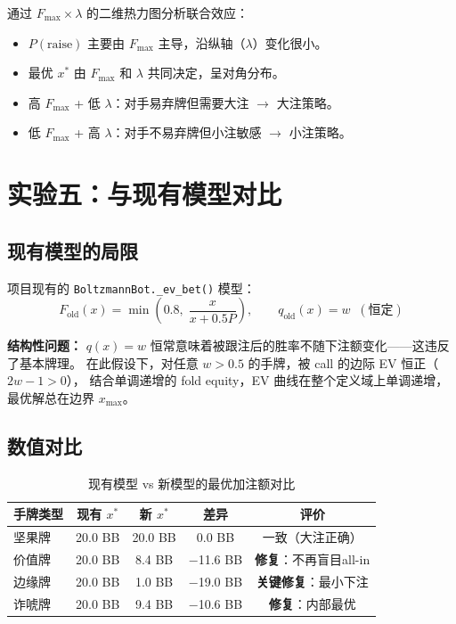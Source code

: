 \documentclass[12pt,a4paper]{ctexart}
\begin{document}
通过 $F_{\max} \times \lambda$ 的二维热力图分析联合效应：
\begin{itemize}
    \item $P(\text{raise})$ 主要由 $F_{\max}$ 主导，沿纵轴（$\lambda$）变化很小。
    \item 最优 $x^*$ 由 $F_{\max}$ 和 $\lambda$ 共同决定，呈对角分布。
    \item 高 $F_{\max}$ + 低 $\lambda$：对手易弃牌但需要大注 $\to$ 大注策略。
    \item 低 $F_{\max}$ + 高 $\lambda$：对手不易弃牌但小注敏感 $\to$ 小注策略。
\end{itemize}

\section{实验五：与现有模型对比}

\subsection{现有模型的局限}

项目现有的 \texttt{BoltzmannBot.\_ev\_bet()} 模型：
\begin{equation}
F_{\text{old}}(x) = \min\left(0.8,\; \frac{x}{x+0.5P}\right), \qquad
q_{\text{old}}(x) = w \;\;(\text{恒定})
\end{equation}

\textbf{结构性问题：}
$q(x) = w$ 恒常意味着被跟注后的胜率不随下注额变化——这违反了基本牌理。
在此假设下，对任意 $w > 0.5$ 的手牌，被 call 的边际 EV 恒正（$2w-1 > 0$），
结合单调递增的 fold equity，EV 曲线在整个定义域上单调递增，最优解总在边界 $x_{\max}$。

\subsection{数值对比}

\begin{table}[H]
\centering
\caption{现有模型 vs 新模型的最优加注额对比}
\begin{tabular}{@{}lcccc@{}}
\toprule
\textbf{手牌类型} & \textbf{现有 $x^*$} & \textbf{新 $x^*$} & \textbf{差异} & \textbf{评价} \\
\midrule
坚果牌  & 20.0 BB & 20.0 BB & 0.0 BB & 一致（大注正确） \\
价值牌  & 20.0 BB & 8.4 BB  & $-$11.6 BB & \textbf{修复}：不再盲目all-in \\
边缘牌  & 20.0 BB & 1.0 BB  & $-$19.0 BB & \textbf{关键修复}：最小下注 \\
诈唬牌  & 20.0 BB & 9.4 BB  & $-$10.6 BB & \textbf{修复}：内部最优 \\
\bottomrule
\end{tabular}
\end{table}
\end{document}
